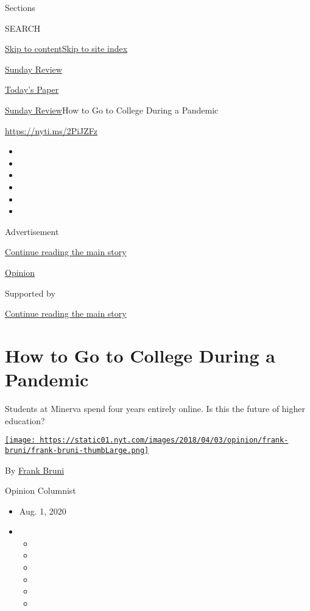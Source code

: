 Sections

SEARCH

\protect\hyperlink{site-content}{Skip to
content}\protect\hyperlink{site-index}{Skip to site index}

\href{https://www.nytimes.com/section/opinion/sunday}{Sunday Review}

\href{https://myaccount.nytimes.com/auth/login?response_type=cookie\&client_id=vi}{}

\href{https://www.nytimes.com/section/todayspaper}{Today's Paper}

\href{/section/opinion/sunday}{Sunday Review}\textbar{}How to Go to
College During a Pandemic

\url{https://nyti.ms/2PiJZFz}

\begin{itemize}
\item
\item
\item
\item
\item
\item
\end{itemize}

Advertisement

\protect\hyperlink{after-top}{Continue reading the main story}

\href{/section/opinion}{Opinion}

Supported by

\protect\hyperlink{after-sponsor}{Continue reading the main story}

\hypertarget{how-to-go-to-college-during-a-pandemic}{%
\section{How to Go to College During a
Pandemic}\label{how-to-go-to-college-during-a-pandemic}}

Students at Minerva spend four years entirely online. Is this the future
of higher education?

\href{https://www.nytimes.com/by/frank-bruni}{\texttt{[image: https://static01.nyt.com/images/2018/04/03/opinion/frank-bruni/frank-bruni-thumbLarge.png]}}

By \href{https://www.nytimes.com/by/frank-bruni}{Frank Bruni}

Opinion Columnist

\begin{itemize}
\item
  Aug. 1, 2020
\item
  \begin{itemize}
  \item
  \item
  \item
  \item
  \item
  \item
  \end{itemize}
\end{itemize}

